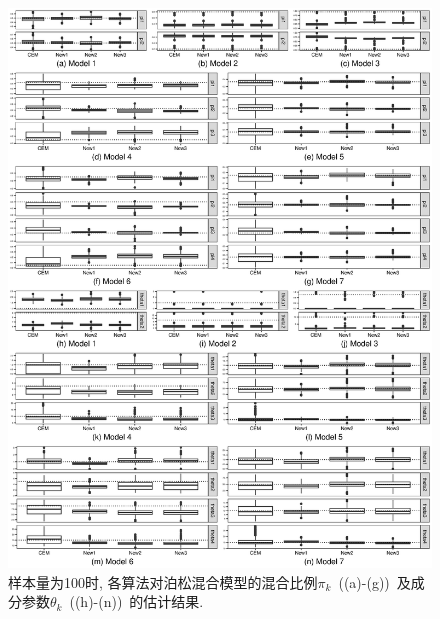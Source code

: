 \documentclass[a4paper,12pt,openany,oneside,utf-8]{ctexbook}
\begin{document}
\begin{figure}[htbp]
  \centering
  \includegraphics[width = 1\textwidth]{Figure_6_Estimates_for_the_mixing_proportions_and_component_means_for_the_Poisson_mixture_models_with_n_100.eps}
  \caption{样本量为100时, 各算法对泊松混合模型的混合比例$\pi_k$~((a)-(g))~及成分参数$\theta_k$~((h)-(n))~的估计结果.}
  \label{fig:Estimates for the mixing proportions and component means for the Poisson mixture models 1-10 with n=100 based on 500 replicates} %
\end{figure}
\end{document}
